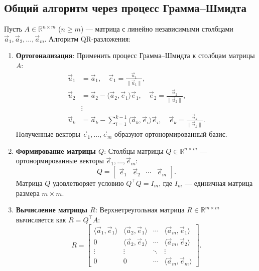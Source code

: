 \documentclass[12pt]{article}
\begin{document}
\subsection*{Общий алгоритм через процесс Грамма–Шмидта}
Пусть $A \in \mathbb{R}^{n \times m}$ ($n \geq m$) — матрица с линейно независимыми столбцами $\vec{a}_1, \vec{a}_2, \dots, \vec{a}_m$.  
Алгоритм QR-разложения:
\begin{enumerate}
    \item \textbf{Ортогонализация}: Применить процесс Грамма–Шмидта к столбцам матрицы $A$:  
    $$
    \begin{aligned}
    \vec{u}_1 &= \vec{a}_1, \quad \vec{e}_1 = \frac{\vec{u}_1}{\|\vec{u}_1\|}, \\
    \vec{u}_2 &= \vec{a}_2 - \langle \vec{a}_2, \vec{e}_1 \rangle \vec{e}_1, \quad \vec{e}_2 = \frac{\vec{u}_2}{\|\vec{u}_2\|}, \\
    &\vdots \\
    \vec{u}_k &= \vec{a}_k - \sum_{i=1}^{k-1} \langle \vec{a}_k, \vec{e}_i \rangle \vec{e}_i, \quad \vec{e}_k = \frac{\vec{u}_k}{\|\vec{u}_k\|}.
    \end{aligned}
    $$
    Полученные векторы $\vec{e}_1, \dots, \vec{e}_m$ образуют ортонормированный базис.
    
    \item \textbf{Формирование матрицы $Q$}:  
    Столбцы матрицы $Q \in \mathbb{R}^{n \times m}$ — ортонормированные векторы $\vec{e}_1, \dots, \vec{e}_m$:  
    $$
    Q = \begin{bmatrix} 
    \vec{e}_1 & \vec{e}_2 & \cdots & \vec{e}_m 
    \end{bmatrix}.
    $$
    Матрица $Q$ удовлетворяет условию $Q^\top Q = I_m$, где $I_m$ — единичная матрица размера $m \times m$.
    
    \item \textbf{Вычисление матрицы $R$}:  
    Верхнетреугольная матрица $R \in \mathbb{R}^{m \times m}$ вычисляется как $R = Q^\top A$:  
    $$
    R = 
    \begin{bmatrix}
    \langle \vec{a}_1, \vec{e}_1 \rangle & \langle \vec{a}_2, \vec{e}_1 \rangle & \cdots & \langle \vec{a}_m, \vec{e}_1 \rangle \\
    0 & \langle \vec{a}_2, \vec{e}_2 \rangle & \cdots & \langle \vec{a}_m, \vec{e}_2 \rangle \\
    \vdots & \vdots & \ddots & \vdots \\
    0 & 0 & \cdots & \langle \vec{a}_m, \vec{e}_m \rangle
    \end{bmatrix}.
    $$
\end{enumerate}
\end{document}

